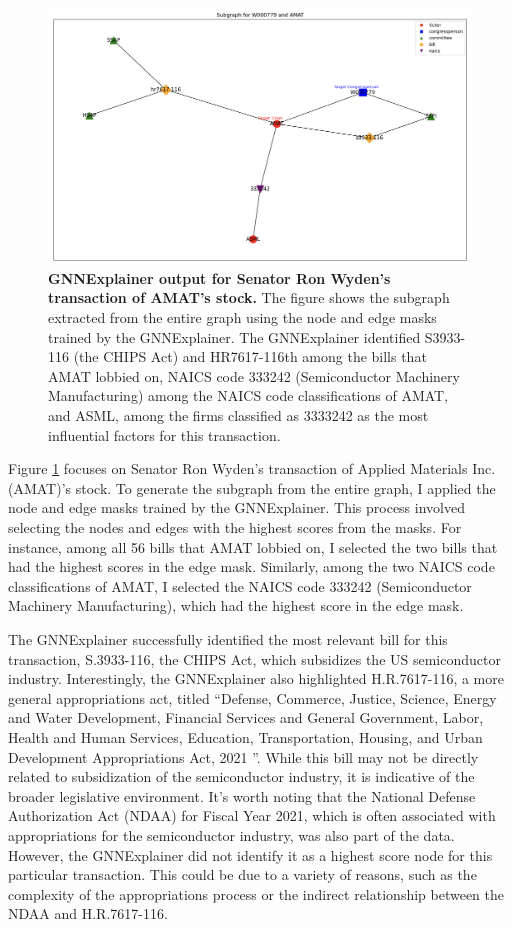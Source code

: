 \documentclass[15pt,letterpaper]{article}
\begin{document}
\begin{figure}[h!]
  \centering
  \includegraphics[width=1.1\textwidth, height=0.4\textheight]{imgs/gnnex-rw-amat.png}
  \caption{\textbf{GNNExplainer output for Senator Ron Wyden's transaction of AMAT's stock.} The figure shows the subgraph extracted from the entire graph using the node and edge masks trained by the GNNExplainer. The GNNExplainer identified S3933-116 (the CHIPS Act) and HR7617-116th among the bills that AMAT lobbied on, NAICS code 333242 (Semiconductor Machinery Manufacturing) among the NAICS code classifications of AMAT, and ASML, among the firms classified as 3333242 as the most influential factors for this transaction.}
  \label{fig:rw-amat}
  \end{figure}

Figure \ref{fig:rw-amat} focuses on Senator Ron Wyden's transaction of Applied Materials Inc. (AMAT)'s stock. To generate the subgraph from the entire graph, I applied the node and edge masks trained by the GNNExplainer. This process involved selecting the nodes and edges with the highest scores from the masks. For instance, among all 56 bills that AMAT lobbied on, I selected the two bills that had the highest scores in the edge mask. Similarly, among the two NAICS code classifications of AMAT, I selected the NAICS code 333242 (Semiconductor Machinery Manufacturing), which had the highest score in the edge mask.


The GNNExplainer successfully identified the most relevant bill for this transaction, S.3933-116, the CHIPS Act, which subsidizes the US semiconductor industry. Interestingly, the GNNExplainer also highlighted H.R.7617-116, a more general appropriations act, titled ``Defense, Commerce, Justice, Science, Energy and Water Development, Financial Services and General Government, Labor, Health and Human Services, Education, Transportation, Housing, and Urban Development Appropriations Act, 2021
''. While this bill may not be directly related to subsidization of the semiconductor industry, it is indicative of the broader legislative environment. It's worth noting that the National Defense Authorization Act (NDAA) for Fiscal Year 2021, which is often associated with appropriations for the semiconductor industry, was also part of the data. However, the GNNExplainer did not identify it as a highest score node for this particular transaction. This could be due to a variety of reasons, such as the complexity of the appropriations process or the indirect relationship between the NDAA and H.R.7617-116.
\end{document}
